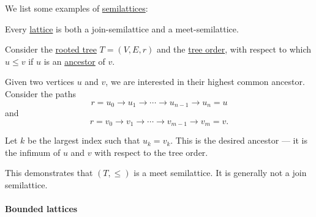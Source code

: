 \begin{example}\label{ex:def:semilattice}
  We list some examples of \hyperref[def:semilattice]{semilattices}:
  \begin{thmenum}
     Every \hyperref[def:lattice]{lattice} is both a join-semilattice and a meet-semilattice.

     Consider the \hyperref[def:rooted_tree]{rooted tree} \( T = (V, E, r) \) and the \hyperref[def:rooted_tree/order]{tree order}, with respect to which \( u \leq v \) if \( u \) is an \hyperref[def:rooted_tree/ancestor_descendant]{ancestor} of \( v \).

    Given two vertices \( u \) and \( v \), we are interested in their highest common ancestor. Consider the paths
    \begin{equation*}
      r = u_0 \to u_1 \to \cdots \to u_{n-1} \to u_n = u
    \end{equation*}
    and
    \begin{equation*}
      r = v_0 \to v_1 \to \cdots \to v_{m-1} \to v_m = v.
    \end{equation*}

    Let \( k \) be the largest index such that \( u_k = v_k \). This is the desired ancestor --- it is the infimum of \( u \) and \( v \) with respect to the tree order.

    This demonstrates that \( (T, \leq) \) is a meet semilattice. It is generally not a join semilattice.
  \end{thmenum}
\end{example}

\paragraph{Bounded lattices}

